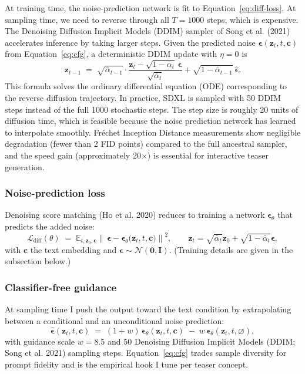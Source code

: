 \documentclass{article}
\begin{document}
At training time, the noise-prediction network is fit to Equation~\ref{eq:diff-loss}. At sampling time, we need to reverse through all $T = 1000$ steps, which is expensive. The Denoising Diffusion Implicit Models (DDIM) sampler of Song et al. (2021) accelerates inference by taking larger steps. Given the predicted noise $\hat{\boldsymbol{\epsilon}}(\mathbf{z}_t, t, \mathbf{c})$ from Equation~\ref{eq:cfg}, a deterministic DDIM update with $\eta = 0$ is
$$\mathbf{z}_{t-1} \;=\; \sqrt{\bar\alpha_{t-1}} \cdot \frac{\mathbf{z}_t - \sqrt{1 - \bar\alpha_t}\,\hat{\boldsymbol{\epsilon}}}{\sqrt{\bar\alpha_t}} + \sqrt{1 - \bar\alpha_{t-1}}\,\hat{\boldsymbol{\epsilon}}.$$
This formula solves the ordinary differential equation (ODE) corresponding to the reverse diffusion trajectory. In practice, SDXL is sampled with 50 DDIM steps instead of the full 1000 stochastic steps. The step size is roughly 20 units of diffusion time, which is feasible because the noise prediction network has learned to interpolate smoothly. Fréchet Inception Distance measurements show negligible degradation (fewer than 2 FID points) compared to the full ancestral sampler, and the speed gain (approximately 20$\times$) is essential for interactive teaser generation.

\subsubsection*{Noise-prediction loss}

Denoising score matching (Ho et al. 2020) reduces to training a network $\boldsymbol{\epsilon}_\theta$ that predicts the added noise:
\begin{equation}
\mathcal{L}_\text{diff}(\theta) \;=\; \mathbb{E}_{t,\mathbf{z}_0,\boldsymbol{\epsilon}}\!\left\|\,\boldsymbol{\epsilon} - \boldsymbol{\epsilon}_\theta\!\bigl(\mathbf{z}_t, t, \mathbf{c}\bigr)\right\|^2, \qquad \mathbf{z}_t = \sqrt{\bar\alpha_t}\mathbf{z}_0 + \sqrt{1-\bar\alpha_t}\boldsymbol{\epsilon},
\label{eq:diff-loss}
\end{equation}
with $\mathbf{c}$ the text embedding and $\boldsymbol{\epsilon} \sim \mathcal{N}(\mathbf{0}, \mathbf{I})$. (Training details are given in the subsection below.)

\subsubsection*{Classifier-free guidance}

At sampling time I push the output toward the text condition by extrapolating between a conditional and an unconditional noise prediction:
\begin{equation}
\hat{\boldsymbol{\epsilon}}(\mathbf{z}_t, t, \mathbf{c}) \;=\; (1 + w)\,\boldsymbol{\epsilon}_\theta(\mathbf{z}_t, t, \mathbf{c}) \;-\; w\,\boldsymbol{\epsilon}_\theta(\mathbf{z}_t, t, \varnothing),
\label{eq:cfg}
\end{equation}
with guidance scale $w = 8.5$ and 50 Denoising Diffusion Implicit Models (DDIM; Song et al. 2021) sampling steps. Equation~\ref{eq:cfg} trades sample diversity for prompt fidelity and is the empirical hook I tune per teaser concept.
\end{document}
